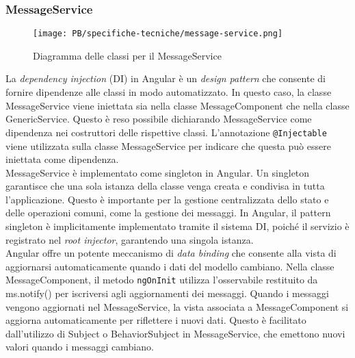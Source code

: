 \subsubsection{MessageService}

\begin{figure}[H]
	\centering
	\texttt{[image: PB/specifiche-tecniche/message-service.png]}
	\caption{Diagramma delle classi per il MessageService}
\end{figure}

La \textit{dependency injection} (DI) in Angular è un \textit{design pattern} che 
consente di fornire dipendenze alle classi in modo automatizzato. In questo 
caso, la classe MessageService viene iniettata sia nella classe 
MessageComponent che nella classe GenericService.
Questo è reso possibile dichiarando MessageService come dipendenza nei 
costruttori delle rispettive classi.
L'annotazione \texttt{@Injectable} viene utilizzata sulla classe MessageService 
per indicare che questa può essere iniettata come dipendenza.\\
MessageService è implementato come singleton in Angular. Un singleton garantisce 
che una sola istanza della classe venga creata e condivisa in tutta 
l'applicazione.
Questo è importante per la gestione centralizzata dello stato e delle operazioni 
comuni, come la gestione dei messaggi.
In Angular, il pattern singleton è implicitamente implementato tramite il 
sistema DI, poiché il servizio è registrato nel \textit{root injector}, 
garantendo una singola istanza.\\
Angular offre un potente meccanismo di \textit{data binding} che consente alla 
vista di aggiornarsi automaticamente quando i dati del modello cambiano.
Nella classe MessageComponent, il metodo \texttt{ngOnInit} utilizza 
l'osservabile restituito da ms.notify() per iscriversi agli aggiornamenti dei 
messaggi.
Quando i messaggi vengono aggiornati nel MessageService, la vista associata a 
MessageComponent si aggiorna automaticamente per riflettere i nuovi dati.
Questo è facilitato dall'utilizzo di Subject o BehaviorSubject in 
MessageService, che emettono nuovi valori quando i messaggi cambiano.
